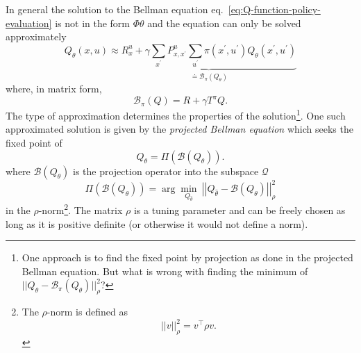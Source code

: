 In general the solution to the Bellman equation eq.~\eqref{eq:Q-function-policy-evaluation} is not in the form $\Phi\theta$ and the equation can only be solved approximately
\begin{equation*}
  Q_\theta(x,u) \approx \underbrace{R_x^u + \gamma\sum_{x^\prime} P_{x,x^\prime}^u \sum_{u^\prime} \pi(x^\prime,u^\prime)Q_\theta(x^\prime,u^\prime)}_{\doteq\mathcal{B}_\pi(Q_\theta)}
\end{equation*}
where, in matrix form,
\begin{equation}
  \label{eq:Q-function-matrix}
  \mathcal{B}_\pi(Q) = R + \gamma T^\pi Q.
\end{equation}
The type of approximation determines the properties of the solution\footnote{One approach is to find the fixed point by projection as done in the projected Bellman equation. But what is wrong with finding the minimum of $||Q_\theta - \mathcal{B}_\pi(Q_\theta)||_\rho^2$?}. One such approximated solution is given by the \emph{projected Bellman equation} which seeks the fixed point of
\begin{equation}
  \label{eq:projected-Bellman-equation}
  Q_\theta = \Pi(\mathcal{B}(Q_\theta)).
\end{equation}
where $\mathcal{B}(Q_\theta)$ is the projection operator into the subspace $\mathcal{Q}$
\begin{equation}
  \label{eq:projection-operator-Bellman-equation}
  \Pi(\mathcal{B}(Q_\theta)) = \arg \min_{Q_{\hat{\theta}}}\ \left|\!\left| Q_{\hat{\theta}} - \mathcal{B}(Q_\theta) \right|\!\right|_\rho^2
\end{equation}
in the $\rho$-norm\footnote{The $\rho$-norm is defined as
\begin{equation*}
  |\!|v|\!|_\rho^2 = v^\top \rho v.
\end{equation*}}. The matrix $\rho$ is a tuning parameter and can be freely chosen as long as it is positive definite (or otherwise it would not define a norm).

